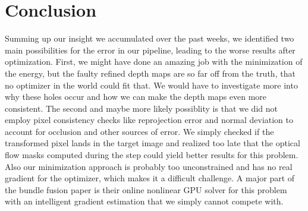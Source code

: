 \chapter{Conclusion}
    Summing up our insight we accumulated over the past weeks, we identified two main possibilities for the error in our pipeline, leading to the worse results after optimization. %
    First, we might have done an amazing job with the minimization of the energy, but the faulty refined depth maps are so far off from the truth, that no optimizer in the world could fit that.
    We would have to investigate more into why these holes occur and how we can make the depth maps even more consistent.
    The second and maybe more likely possiblity is that we did not employ pixel consistency checks like reprojection error and normal deviation to account for occlusion and other sources of error.
    We simply checked if the transformed pixel lands in the target image and realized too late that the optical flow masks computed during the  step could yield better results for this problem.
    Also our minimization approach is probably too unconstrained and has no real gradient for the optimizer, which makes it a difficult challenge.
    A major part of the bundle fusion paper is their online nonlinear GPU solver for this problem with an intelligent gradient estimation that we simply cannot compete with.

